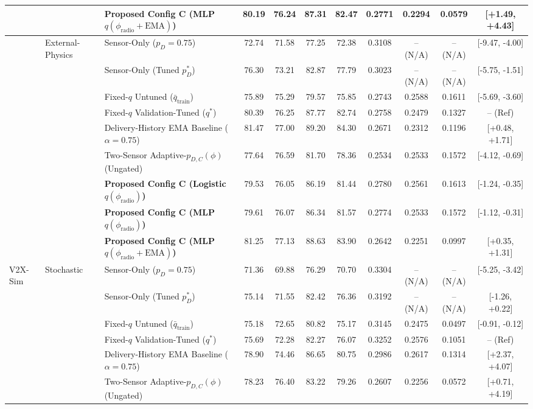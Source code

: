 \begin{table}[!t]
\begin{tabular}{lllcccccccc}
 &  & \textbf{Proposed Config C (MLP $q(\phi_{\text{radio}}+\text{EMA})$)} & 80.19 & 76.24 & 87.31 & 82.47 & 0.2771 & 0.2294 & 0.0579 & [+1.49, +4.43] \\
\midrule
 & External-Physics & Sensor-Only ($p_D=0.75$) & 72.74 & 71.58 & 77.25 & 72.38 & 0.3108 & -- (N/A) & -- (N/A) & [-9.47, -4.00] \\
 &  & Sensor-Only (Tuned $p_D^*$) & 76.30 & 73.21 & 82.87 & 77.79 & 0.3023 & -- (N/A) & -- (N/A) & [-5.75, -1.51] \\
 &  & Fixed-$q$ Untuned ($\bar{q}_{\text{train}}$) & 75.89 & 75.29 & 79.57 & 75.85 & 0.2743 & 0.2588 & 0.1611 & [-5.69, -3.60] \\
 &  & Fixed-$q$ Validation-Tuned ($q^*$) & 80.39 & 76.25 & 87.77 & 82.74 & 0.2758 & 0.2479 & 0.1327 & -- (Ref) \\
 &  & Delivery-History EMA Baseline ($\alpha=0.75$) & 81.47 & 77.00 & 89.20 & 84.30 & 0.2671 & 0.2312 & 0.1196 & [+0.48, +1.71] \\
 &  & Two-Sensor Adaptive-$p_{D,C}(\phi)$ (Ungated) & 77.64 & 76.59 & 81.70 & 78.36 & 0.2534 & 0.2533 & 0.1572 & [-4.12, -0.69] \\
 &  & \textbf{Proposed Config C (Logistic $q(\phi_{\text{radio}})$)} & 79.53 & 76.05 & 86.19 & 81.44 & 0.2780 & 0.2561 & 0.1613 & [-1.24, -0.35] \\
 &  & \textbf{Proposed Config C (MLP $q(\phi_{\text{radio}})$)} & 79.61 & 76.07 & 86.34 & 81.57 & 0.2774 & 0.2533 & 0.1572 & [-1.12, -0.31] \\
 &  & \textbf{Proposed Config C (MLP $q(\phi_{\text{radio}}+\text{EMA})$)} & 81.25 & 77.13 & 88.63 & 83.90 & 0.2642 & 0.2251 & 0.0997 & [+0.35, +1.31] \\
\midrule
V2X-Sim & Stochastic & Sensor-Only ($p_D=0.75$) & 71.36 & 69.88 & 76.29 & 70.70 & 0.3304 & -- (N/A) & -- (N/A) & [-5.25, -3.42] \\
 &  & Sensor-Only (Tuned $p_D^*$) & 75.14 & 71.55 & 82.42 & 76.36 & 0.3192 & -- (N/A) & -- (N/A) & [-1.26, +0.22] \\
 &  & Fixed-$q$ Untuned ($\bar{q}_{\text{train}}$) & 75.18 & 72.65 & 80.82 & 75.17 & 0.3145 & 0.2475 & 0.0497 & [-0.91, -0.12] \\
 &  & Fixed-$q$ Validation-Tuned ($q^*$) & 75.69 & 72.28 & 82.27 & 76.07 & 0.3252 & 0.2576 & 0.1051 & -- (Ref) \\
 &  & Delivery-History EMA Baseline ($\alpha=0.75$) & 78.90 & 74.46 & 86.65 & 80.75 & 0.2986 & 0.2617 & 0.1314 & [+2.37, +4.07] \\
 &  & Two-Sensor Adaptive-$p_{D,C}(\phi)$ (Ungated) & 78.23 & 76.40 & 83.22 & 79.26 & 0.2607 & 0.2256 & 0.0572 & [+0.71, +4.19] \\

\end{tabular}
\end{table}
